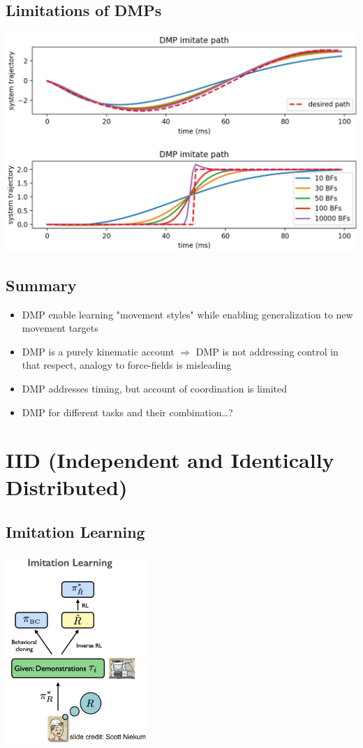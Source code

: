 \documentclass[10pt]{article}
\begin{document}
\subsection*{Limitations of DMPs}
\begin{center} 
	\includegraphics*[width=\textwidth]{L1_14.png} 
\end{center}

\subsection*{Summary}
\begin{itemize}
	\item DMP enable learning "movement styles" while enabling generalization to new movement targets
	\item DMP is a purely kinematic account $\Rightarrow$ DMP is not addressing control in that respect, analogy to force-fields is misleading
	\item DMP addresses timing, but account of coordination is limited
	\item DMP for different tasks and their combination\dots?
\end{itemize}

\section*{IID (Independent and Identically Distributed)}
\subsection*{Imitation Learning}
\begin{center}
    \includegraphics*[width=0.4\textwidth]{L2_1.png}
\end{center}
\end{document}
